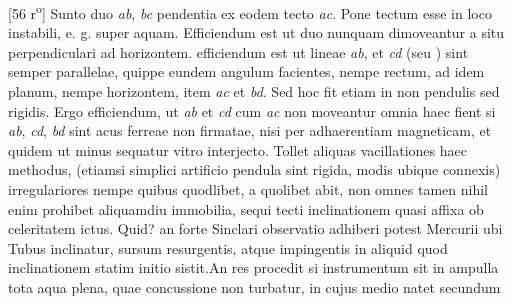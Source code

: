                 \vspace*{8mm}
                \pstart 
                \normalsize
            [56 r\textsuperscript{o}] Sunto duo  \textit{ab}, \textit{bc} pendentia ex eodem tecto\protect{} \textit{ac}. Pone tectum\protect{} esse in loco instabili, e. g. super aquam. Efficiendum est ut duo  nunquam dimoveantur a situ perpendiculari ad horizontem.  efficiendum est ut lineae \textit{ab}, et \textit{cd} (seu ) sint semper parallelae, quippe eundem angulum facientes, nempe rectum, ad idem planum, nempe horizontem, item  \textit{ac} et \textit{bd}. Sed hoc fit etiam in non pendulis\protect{} sed rigidis. Ergo efficiendum, ut \textit{ab} et \textit{cd} cum \textit{ac} non moveantur omnia haec fient si \textit{ab}, \textit{cd}, \textit{bd} sint acus ferreae\protect{} non firmatae, nisi per adhaerentiam magneticam, et quidem ut minus sequatur vitro interjecto. Tollet aliquas vacillationes haec methodus, (etiamsi simplici artificio pendula\protect{} sint rigida, modis ubique connexis) irregulariores nempe quibus quodlibet, a quolibet abit, non omnes tamen nihil enim prohibet aliquamdiu immobilia, sequi tecti\protect{} inclinationem\protect{} quasi affixa ob celeritatem\protect{} ictus\protect{}. \pend \newpage \pstart  Quid? an forte Sinclari\protect{} observatio adhiberi potest Mercurii\protect{} ubi Tubus inclinatur, sursum resurgentis, atque impingentis in aliquid quod inclinationem\protect{} statim initio sistit.\pend \pstart An res procedit si instrumentum sit in ampulla tota aqua plena, quae concussione non turbatur, in cujus medio natet secundum \pend
